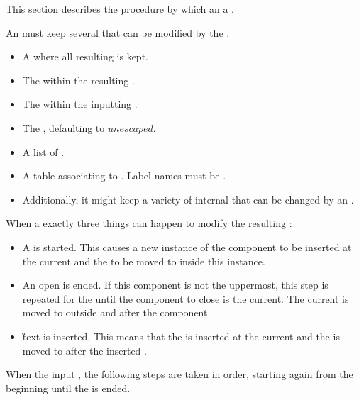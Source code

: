 This section describes the procedure by which an   a .

An  must keep several  that can be modified by the .

\begin{itemize}
\item A   where all resulting  is kept.
\item The  within the resulting .
\item The  within the inputting .
\item The , defaulting to \inline$unescaped$.
\item A list of .
\item A table associating  to . Label names must be .
\item Additionally, it might keep a variety of internal  that can be changed by an .
\end{itemize}

When  a  exactly three things can happen to modify the resulting :

\begin{itemize}
\item A  is started. This causes a new instance of the component to be inserted at the current  and the  to be moved to inside this instance.
\item An open  is ended. If this component is not the uppermost, this step is repeated for the  until the component to close is the current. The current  is moved to outside and after the component.
\item \G{text} is inserted. This means that the  is inserted at the current  and the  is moved to after the inserted .
\end{itemize}

When  the input , the following steps are taken in order, starting again from the beginning until the   is ended.

